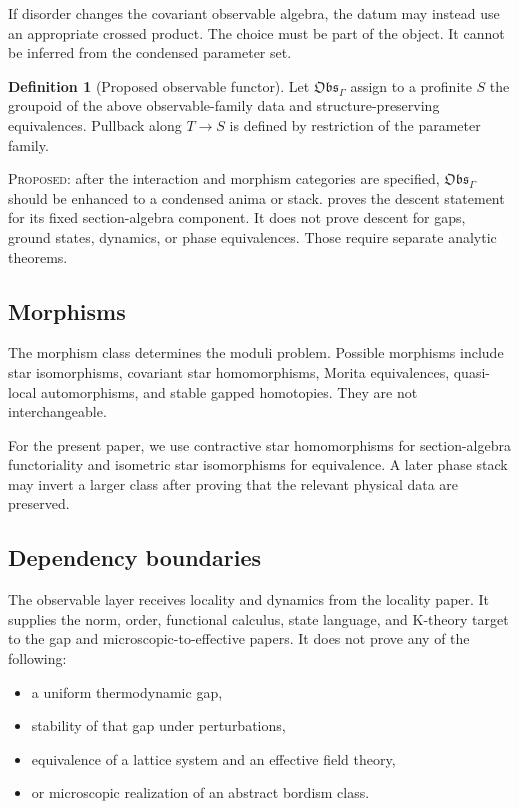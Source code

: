 \documentclass[12pt]{article}
\theoremstyle{definition}
\newtheorem{definition}[theorem]{Definition}
\theoremstyle{remark}
\newcommand{\Status}[1]{\textsc{#1}}
\begin{document}
If disorder changes the covariant observable algebra, the datum may instead use an
appropriate crossed product.  The choice must be part of the object.  It cannot be
inferred from the condensed parameter set.

\begin{definition}[Proposed observable functor]
Let $\mathfrak{Obs}_{\Gamma}$ assign to a profinite $S$ the groupoid of the above
observable-family data and structure-preserving equivalences.  Pullback along
$T\to S$ is defined by restriction of the parameter family.
\end{definition}

\Status{Proposed}: after the interaction and morphism categories are specified,
$\mathfrak{Obs}_{\Gamma}$ should be enhanced to a condensed anima or stack.
 proves the descent statement for its fixed section-algebra
component.  It does not prove descent for gaps, ground states, dynamics, or phase
equivalences.  Those require separate analytic theorems.

\subsection{Morphisms}

The morphism class determines the moduli problem.  Possible morphisms include
star isomorphisms, covariant star homomorphisms, Morita equivalences, quasi-local
automorphisms, and stable gapped homotopies.  They are not interchangeable.

For the present paper, we use contractive star homomorphisms for section-algebra
functoriality and isometric star isomorphisms for equivalence.  A later phase stack may
invert a larger class after proving that the relevant physical data are preserved.

\subsection{Dependency boundaries}

The observable layer receives locality and dynamics from the locality paper.  It
supplies the norm, order, functional calculus, state language, and K-theory target to
the gap and microscopic-to-effective papers.  It does not prove any of the following:

\begin{itemize}[leftmargin=2em]
\item a uniform thermodynamic gap,
\item stability of that gap under perturbations,
\item equivalence of a lattice system and an effective field theory,
\item or microscopic realization of an abstract bordism class.
\end{itemize}
\end{document}
